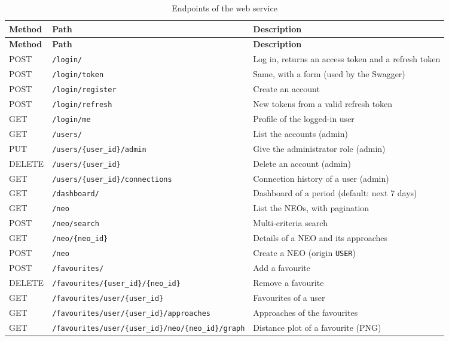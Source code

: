 {\small
\begin{longtable}{@{}l l p{5.2cm}@{}}
  \toprule
  \textbf{Method} & \textbf{Path} & \textbf{Description} \\
  \midrule
  \endfirsthead
  \toprule
  \textbf{Method} & \textbf{Path} & \textbf{Description} \\
  \midrule
  \endhead
  \bottomrule
  \caption{Endpoints of the web service}
  \label{tab:endpoints}
  \endlastfoot
  POST & \texttt{/login/} & Log in, returns an access token and a refresh token \\
  POST & \texttt{/login/token} & Same, with a form (used by the Swagger) \\
  POST & \texttt{/login/register} & Create an account \\
  POST & \texttt{/login/refresh} & New tokens from a valid refresh token \\
  GET & \texttt{/login/me} & Profile of the logged-in user \\
  GET & \texttt{/users/} & List the accounts (admin) \\
  PUT & \texttt{/users/\{user\_id\}/admin} & Give the administrator role (admin) \\
  DELETE & \texttt{/users/\{user\_id\}} & Delete an account (admin) \\
  GET & \texttt{/users/\{user\_id\}/connections} & Connection history of a user (admin) \\
  GET & \texttt{/dashboard/} & Dashboard of a period (default: next 7 days) \\
  GET & \texttt{/neo} & List the NEOs, with pagination \\
  POST & \texttt{/neo/search} & Multi-criteria search\\
  GET & \texttt{/neo/\{neo\_id\}} & Details of a NEO and its approaches \\
  POST & \texttt{/neo} & Create a NEO (origin \texttt{USER}) \\
  POST & \texttt{/favourites/} & Add a favourite \\
  DELETE & \texttt{/favourites/\{user\_id\}/\{neo\_id\}} & Remove a favourite \\
  GET & \texttt{/favourites/user/\{user\_id\}} & Favourites of a user \\
  GET & \texttt{/favourites/user/\{user\_id\}/approaches} & Approaches of the favourites \\
  GET & \texttt{/favourites/user/\{user\_id\}/neo/\{neo\_id\}/graph} & Distance plot of a favourite (PNG) \\

\end{longtable}}
